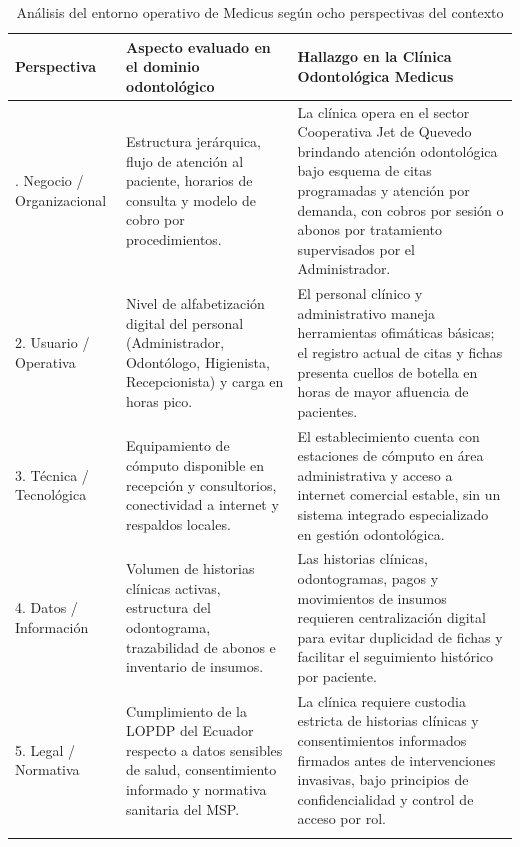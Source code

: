 \documentclass[12pt,a4paper]{article}
\begin{document}
\begin{table}[htbp]
\centering
\caption{Análisis del entorno operativo de Medicus según ocho perspectivas del contexto}
\label{tab:ocho_perspectivas}
\begingroup
\scriptsize
\setlength{\tabcolsep}{3pt}
\renewcommand{\arraystretch}{1.2}
\begin{tabularx}{\textwidth}{
>{\raggedright\arraybackslash}p{2.25cm}
>{\raggedright\arraybackslash}X
>{\raggedright\arraybackslash}X}
\toprule
\textbf{Perspectiva} &
\textbf{Aspecto evaluado en el dominio odontológico} &
\textbf{Hallazgo en la Clínica Odontológica Medicus}\\
\midrule

1. Negocio / Organizacional &
Estructura jerárquica, flujo de atención al paciente, horarios de consulta y modelo de cobro por procedimientos. &
La clínica opera en el sector Cooperativa Jet de Quevedo brindando atención odontológica bajo esquema de citas programadas y atención por demanda, con cobros por sesión o abonos por tratamiento supervisados por el Administrador.\\
\addlinespace

2. Usuario / Operativa &
Nivel de alfabetización digital del personal (Administrador, Odontólogo, Higienista, Recepcionista) y carga en horas pico. &
El personal clínico y administrativo maneja herramientas ofimáticas básicas; el registro actual de citas y fichas presenta cuellos de botella en horas de mayor afluencia de pacientes.\\
\addlinespace

3. Técnica / Tecnológica &
Equipamiento de cómputo disponible en recepción y consultorios, conectividad a internet y respaldos locales. &
El establecimiento cuenta con estaciones de cómputo en área administrativa y acceso a internet comercial estable, sin un sistema integrado especializado en gestión odontológica.\\
\addlinespace

4. Datos / Información &
Volumen de historias clínicas activas, estructura del odontograma, trazabilidad de abonos e inventario de insumos. &
Las historias clínicas, odontogramas, pagos y movimientos de insumos requieren centralización digital para evitar duplicidad de fichas y facilitar el seguimiento histórico por paciente.\\
\addlinespace

5. Legal / Normativa &
Cumplimiento de la LOPDP del Ecuador \cite{lopdp2021} respecto a datos sensibles de salud, consentimiento informado y normativa sanitaria del MSP. &
La clínica requiere custodia estricta de historias clínicas y consentimientos informados firmados antes de intervenciones invasivas, bajo principios de confidencialidad y control de acceso por rol.\\
\addlinespace


\end{tabularx}
\end{table}
\end{document}
